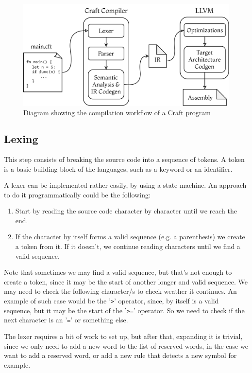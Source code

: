 ﻿\documentclass[10pt,a4paper,twocolumn,twoside]{article}
\begin{document}
\begin{figure}[ht]
\centering
\captionsetup{justification=centering,margin=1cm}
\includegraphics[width=\linewidth]{arch}
\caption{Diagram showing the compilation workflow of a Craft program}
\end{figure}

\subsection{Lexing} 
This step consists of breaking the source code into a sequence of tokens. A
token is a basic building block of the languages, such as a keyword or an
identifier.

A lexer can be implemented rather easily, by using a state machine. An approach
to do it programmatically could be the following:

\begin{enumerate}
    \item Start by reading the source code character by character until we reach
        the end.
    \item If the character by itself forms a valid sequence (e.g. a parenthesis)
        we create a token from it. If it doesn't, we continue reading characters
        until we find a valid sequence. 
\end{enumerate}

Note that sometimes we may find a valid sequence, but that's not enough to
create a token, since it may be the start of another longer and valid sequence.
We may need to check the following character/s to check weather it continues. An
example of such case would be the '\texttt{>}' operator, since, by itself is a
valid sequence, but it may be the start of the '\texttt{>=}' operator. So we
need to check if the next character is an '\texttt{=}' or something else.

The lexer requires a bit of work to set up, but after that, expanding it is 
trivial, since we only need to add a new word to the list of reserved words, in 
the case we want to add a reserved word, or add a new rule that detects a new 
symbol for example.
\end{document}
